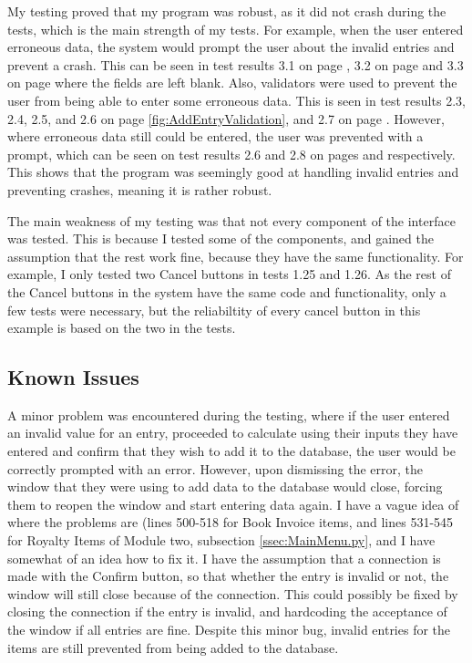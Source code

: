 My testing proved that my program was robust, as it did not crash during the tests, which is the main strength of my tests. For example, when the user entered erroneous data, the system would prompt the user about the invalid entries and prevent a crash. This can be seen in test results 3.1 on page \pageref{fig:AddBookValidation}, 3.2 on page \pageref{fig:AddInvoiceItemTest} and 3.3 on page \pageref{fig:AddRoyaltyItemTest} where the fields are left blank. Also, validators were used to prevent the user from being able to enter some erroneous data. This is seen in test results 2.3, 2.4, 2.5, and 2.6 on page \ref{fig:AddEntryValidation}, and 2.7 on page \pageref{fig:ISBNRejection}. However, where erroneous data still could be entered, the user was prevented with a prompt, which can be seen on test results 2.6 and 2.8 on pages \pageref{fig:InvalidAddress} and \pageref{fig:PagesRejection} respectively. This shows that the program was seemingly good at handling invalid entries and preventing crashes, meaning it is rather robust.

The main weakness of my testing was that not every component of the interface was tested. This is because I tested some of the components, and gained the assumption that the rest work fine, because they have the same functionality. For example, I only tested two Cancel buttons in tests 1.25 and 1.26. As the rest of the Cancel buttons in the system have the same code and functionality, only a few tests were necessary, but the reliabiltity of every cancel button in this example is based on the two in the tests.

\subsection{Known Issues}

A minor problem was encountered during the testing, where if the user entered an invalid value for an entry, proceeded to calculate using their inputs they have entered and confirm that they wish to add it to the database, the user would be correctly prompted with an error. However, upon dismissing the error, the window that they were using to add data to the database would close, forcing them to reopen the window and start entering data again. I have a vague idea of where the problems are (lines 500-518 for Book Invoice items, and lines 531-545 for Royalty Items of Module two, subsection \ref{ssec:MainMenu.py}, and I have somewhat of an idea how to fix it. I have the assumption that a connection is made with the Confirm button, so that whether the entry is invalid or not, the window will still close because of the connection. This could possibly be fixed by closing the connection if the entry is invalid, and hardcoding the acceptance of the window if all entries are fine. Despite this minor bug, invalid entries for the items are still prevented from being added to the database.

